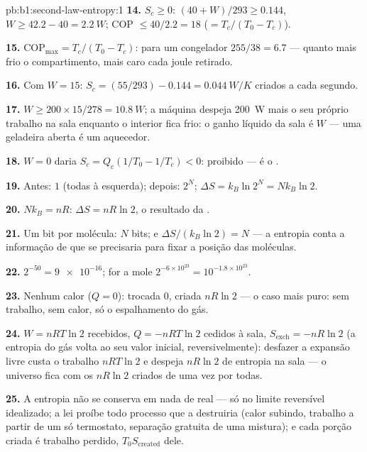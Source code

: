 \begin{solution}{pb:b1:second-law-entropy:1}
\textbf{14.} $S_c \geq 0$: $(40 + W)/293 \geq 0.144$, $W \geq 42.2 - 40 =
\qty{2.2}{W}$; COP $\leq 40/2.2 = 18$ ($= T_c/(T_0 - T_c)$).

\textbf{15.} $\mathrm{COP}_{\max} = T_c/(T_0 - T_c)$: para um congelador $255/38 = 6.7$
--- quanto mais frio o compartimento, mais caro cada joule retirado.

\textbf{16.} Com $W = 15$: $S_c = (55/293) - 0.144 = \qty{0.044}{W/K}$ criados
a cada segundo.

\textbf{17.} $W \geq 200 \times 15/278 = \qty{10.8}{W}$; a máquina despeja
\qty{200}{W} mais o seu próprio trabalho na sala enquanto o interior fica
frio: o ganho líquido da sala é $W$ --- uma geladeira aberta é um aquecedor.

\textbf{18.} $W = 0$ daria $S_c = Q_c(1/T_0 - 1/T_c) < 0$: proibido ---
é o .

\textbf{19.} Antes: $1$ (todas à esquerda); depois: $2^N$; $\Delta S = k_B\ln2^N =
Nk_B\ln2$.

\textbf{20.} $Nk_B = nR$: $\Delta S = nR\ln2$, o resultado da .

\textbf{21.} Um bit por molécula: $N$ bits; e $\Delta S/(k_B\ln2) = N$ ---
a entropia conta a informação de que se precisaria para fixar a posição
das moléculas.

\textbf{22.} $2^{-50} = \num{9e-16}$; for a mole $2^{-6\times10^{23}} =
10^{-1.8\times10^{23}}$.

\textbf{23.} Nenhum calor ($Q = 0$): trocada $0$, criada $nR\ln2$ --- o caso
mais puro: sem trabalho, sem calor, só o espalhamento do gás.

\textbf{24.} $W = nRT\ln2$ recebidos, $Q = -nRT\ln2$ cedidos à sala,
$S_{\mathrm{exch}} = -nR\ln2$ (a entropia do gás volta ao seu valor
inicial, reversivelmente): desfazer a expansão livre custa o trabalho $nRT\ln2$
e despeja $nR\ln2$ de entropia na sala --- o universo fica com os
$nR\ln2$ criados de uma vez por todas.

\textbf{25.} A entropia não se conserva em nada de real --- só no limite
reversível idealizado; a lei proíbe todo processo que a destruiria (calor
subindo, trabalho a partir de um só termostato, separação gratuita de uma
mistura); e cada porção criada é trabalho perdido, $T_0S_{\mathrm{created}}$ dele.
\end{solution}
